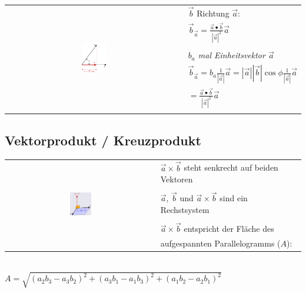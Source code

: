 \begin{tabular}{cl}
    \multirow{7}{*}{
        \includegraphics[width=0.15\textwidth]{assets/projection-of-vector.png}
    }
    & $\vec{b}$ Richtung $\vec{a}$:\\
    & $\vec{b}_{\vec{a}} = \frac{\vec{a} \bullet \vec{b}}{|\vec{a}|^2} \vec{a}$\\
    & \\
    & \textit{$b_a$ mal Einheitsvektor $\vec{a}$} \\
    &
        $\vec{b}_{\vec{a}} = b_a \frac{1}{|\vec{a}|} \vec{a} =
        |\vec{a}||\vec{b}|\cos \phi \frac{1}{|\vec{a}|} \vec{a}$ \\
    & $= \frac{\vec{a} \bullet \vec{b}}{|\vec{a}|^2} \vec{a}$\\
    & \\
\end{tabular}

\subsection{Vektorprodukt / Kreuzprodukt}

\begin{tabular}{cl}
    \multirow{7}{*}{
        \includegraphics[width=0.15\textwidth]{assets/vectorproduct.png}
    }
    & $\vec{a} \times \vec{b}$ steht senkrecht auf beiden Vektoren \\
    & \\
    & $\vec{a}$, $\vec{b}$ und $\vec{a} \times \vec{b}$ sind ein Rechstsystem \\
    & \\
    & $\vec{a} \times \vec{b}$ entspricht der Fläche des \\
    & aufgespannten Parallelogramms ($A$): \\
\end{tabular} \\

$A = \sqrt{(a_2 b_3 - a_3 b_2)^2 + (a_3 b_1 - a_1 b_3)^2 + (a_1 b_2 - a_2 b_1)^2}$ \\

